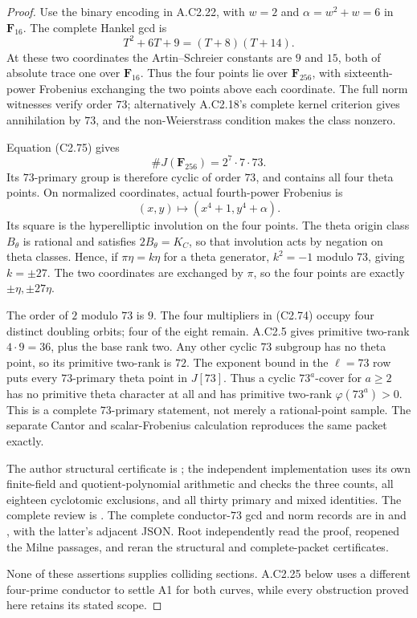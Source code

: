 \begin{proof}
Use the binary encoding in A.C2.22, with
$w=2$ and $\alpha=w^2+w=6$ in $\mathbf F_{16}$.
The complete Hankel gcd is
\[
             T^2+6T+9=(T+8)(T+14).
\]
At these two coordinates the
Artin--Schreier constants are $9$ and $15$,
both of absolute trace one over $\mathbf F_{16}$.
Thus the four points lie over $\mathbf F_{256}$,
with sixteenth-power Frobenius exchanging
the two points above each coordinate.
The full norm witnesses verify order $73$;
alternatively A.C2.18's complete kernel
criterion gives annihilation by $73$, and
the non-Weierstrass condition makes the
class nonzero.

Equation (C2.75) gives
\[
                 \#J(\mathbf F_{256})=2^7\cdot7\cdot73.
\]
Its $73$-primary group is therefore cyclic
of order $73$, and contains all four theta
points. On normalized coordinates, actual
fourth-power Frobenius is
\[
                 (x,y)\longmapsto(x^4+1,y^4+\alpha).
\]
Its square is the hyperelliptic involution
on the four points. The theta origin class
$B_\theta$ is rational and satisfies
$2B_\theta=K_C$, so that involution acts by
negation on theta classes. Hence, if
$\pi\eta=k\eta$ for a theta generator,
$k^2=-1$ modulo $73$, giving $k=\pm27$.
The two coordinates are exchanged by
$\pi$, so the four points are exactly
$\pm\eta,\pm27\eta$.

The order of $2$ modulo $73$ is $9$.
The four multipliers in (C2.74) occupy
four distinct doubling orbits; four of
the eight remain. A.C2.5 gives primitive
two-rank $4\cdot9=36$, plus the base rank
two. Any other cyclic $73$ subgroup has
no theta point, so its primitive two-rank
is $72$. The exponent bound in the
$\ell=73$ row puts every $73$-primary
theta point in $J[73]$. Thus a cyclic
$73^a$-cover for $a\ge2$ has no primitive
theta character at all and has primitive
two-rank $\varphi(73^a)>0$.
This is a complete
$73$-primary statement, not merely a
rational-point sample. The separate Cantor
and scalar-Frobenius calculation reproduces
the same packet exactly.

The author structural certificate is
;
the independent implementation
uses its own finite-field and quotient-polynomial
arithmetic and checks the three counts,
all eighteen cyclotomic exclusions, and
all thirty primary and mixed identities.
The complete review is
.
The complete conductor-$73$ gcd and norm
records are in
and
,
with the latter's adjacent JSON.
Root independently read the proof, reopened
the Milne passages, and reran the structural
and complete-packet certificates.

None of these assertions supplies colliding
sections. A.C2.25 below uses a different
four-prime conductor to settle A1 for both
curves, while every obstruction proved here
retains its stated scope.
\end{proof}
